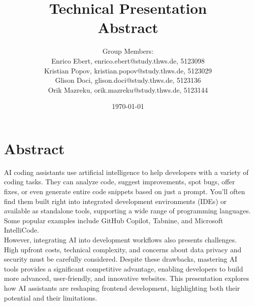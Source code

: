 \documentclass[a4paper,12pt]{article}
\title{Technical Presentation \\
	Abstract}
\author{
	Group Members: \\
	Enrico Ebert, enrico.ebert@study.thws.de, 5123098 \\
	Kristian Popov, kristian.popov@study.thws.de, 5123029 \\
	Glison Doci, glison.doci@study.thws.de, 5123136 \\
	Orik Mazreku, orik.mazreku@study.thws.de, 5123144
}
\date{\today}
\begin{document}
	
	\maketitle

\section*{Abstract}	
AI coding assistants use artificial intelligence to help developers with a variety of coding tasks. They can analyze code, suggest improvements, spot bugs, offer fixes, or even generate entire code snippets based on just a prompt. You’ll often find them built right into integrated development environments (IDEs) or available as standalone tools, supporting a wide range of programming languages. Some popular examples include GitHub Copilot, Tabnine, and Microsoft IntelliCode. \\
However, integrating AI into development workflows also presents challenges. High upfront costs, technical complexity, and concerns about data privacy and security must be carefully considered. Despite these drawbacks, mastering AI tools provides a significant competitive advantage, enabling developers to build more advanced, user-friendly, and innovative websites. This presentation explores how AI assistants are reshaping frontend development, highlighting both their potential and their limitations.
\end{document}
